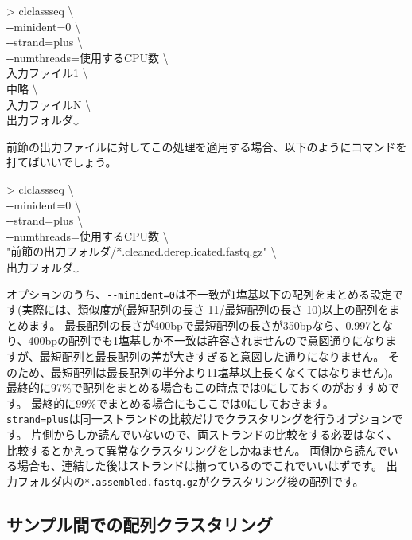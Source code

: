 \documentclass[titlepage,10pt,a4paper]{jsbook}
\newenvironment{cmd}{\begin{oframed}\raggedright\ttfamily\footnotesize\setlength{\baselineskip}{1.4em}}{\end{oframed}\vspace{-1em}}
\begin{document}
\begin{cmd}
{\textgreater} clclassseq {\textbackslash}\\
{-}{-}minident=0 {\textbackslash}\\
{-}{-}strand=plus {\textbackslash}\\
{-}{-}numthreads=使用するCPU数 {\textbackslash}\\
入力ファイル1 {\textbackslash}\\
中略 {\textbackslash}\\
入力ファイルN {\textbackslash}\\
出力フォルダ↓
\end{cmd}

前節の出力ファイルに対してこの処理を適用する場合、以下のようにコマンドを打てばいいでしょう。

\begin{cmd}
{\textgreater} clclassseq {\textbackslash}\\
{-}{-}minident=0 {\textbackslash}\\
{-}{-}strand=plus {\textbackslash}\\
{-}{-}numthreads=使用するCPU数 {\textbackslash}\\
"前節の出力フォルダ/*.cleaned.dereplicated.fastq.gz" {\textbackslash}\\
出力フォルダ↓
\end{cmd}

オプションのうち、\texttt{{-}{-}minident=0}は不一致が1塩基以下の配列をまとめる設定です(実際には、類似度が(最短配列の長さ-11/最短配列の長さ-10)以上の配列をまとめます。
最長配列の長さが400bpで最短配列の長さが350bpなら、0.997となり、400bpの配列でも1塩基しか不一致は許容されませんので意図通りになりますが、最短配列と最長配列の差が大きすぎると意図した通りになりません。
そのため、最短配列は最長配列の半分より11塩基以上長くなくてはなりません)。
最終的に97\%で配列をまとめる場合もこの時点では0にしておくのがおすすめです。
最終的に99\%でまとめる場合にもここでは0にしておきます。
\texttt{{-}{-}strand=plus}は同一ストランドの比較だけでクラスタリングを行うオプションです。
片側からしか読んでいないので、両ストランドの比較をする必要はなく、比較するとかえって異常なクラスタリングをしかねません。
両側から読んでいる場合も、連結した後はストランドは揃っているのでこれでいいはずです。
出力フォルダ内の\texttt{*.assembled.fastq.gz}がクラスタリング後の配列です。

\subsection{サンプル間での配列クラスタリング}
\end{document}
